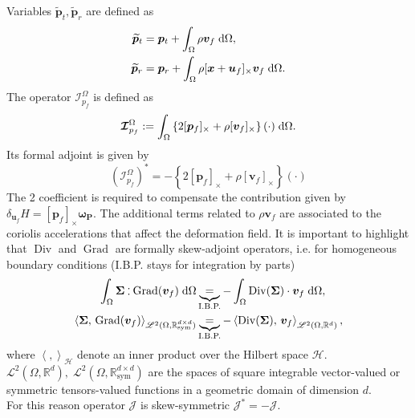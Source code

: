 \documentclass{svjour3}                     %
\DeclareMathOperator*{\Grad}{Grad}
\DeclareMathOperator*{\Div}{Div}
\newcommand{\crmat}[1]{\ensuremath{[#1]_{\times}}}
\def\onedot{$\mathsurround0pt\ldotp$}
\def\cddot{%
	\mathbin{\vcenter{\baselineskip.67ex
			\hbox{\onedot}\hbox{\onedot}}%
}}
\begin{document}
Variables $\widetilde{\bm{p}}_t, \widetilde{\bm{p}}_r$ are defined as
\begin{equation}
\label{eq:mod_momenta}
\begin{aligned}
\widetilde{\bm{p}}_t &= \bm{p}_t + \int_{\Omega} \rho \bm{v}_f \d{\Omega}, \\
\widetilde{\bm{p}}_r &= \bm{p}_r + \int_{\Omega} \rho \crmat{\bm{x} + \bm{u}_f}\bm{v}_f \d{\Omega}. \\
\end{aligned}
\end{equation}
The operator $\bm{\mathcal{I}}_{p_f}^\Omega$ is defined as 
\begin{equation}
\label{eq:mod_momentafl}
\bm{\mathcal{I}}_{p_f}^\Omega := \int_\Omega \left\{2 \crmat{\bm{p}_f} + \rho \crmat{\bm{v}_f} \right\}(\cdot) \d{\Omega}.
\end{equation}
Its  formal adjoint is given by
\begin{equation*}
(\bm{\mathcal{I}}_{p_f}^\Omega)^* = - \left\{2 \crmat{\bm{p}_f} + \rho \crmat{\bm{v}_f} \right\}(\cdot)
\end{equation*} 
The 2 coefficient is required to compensate the contribution given by $\delta_{\bm{u}_f} H = \crmat{\bm{p}_f} \bm{\omega_{P}}$. The additional terms related to $\rho \bm{v}_f$ are associated to the coriolis accelerations that affect the deformation field. It is important to highlight that $\Div$ and $\Grad$ are formally skew-adjoint operators, i.e. for homogeneous boundary conditions (I.B.P. stays for integration by parts)
\begin{align*}
\int_{\Omega} \bm\Sigma \cddot \Grad(\bm{v}_f) \d{\Omega} &\underbrace{=}_{\text{I.B.P.}} -\int_{\Omega} \Div(\bm\Sigma) \cdot \bm{v}_f \d{\Omega}, \\
\left\langle \bm\Sigma, \, \Grad(\bm{v}_f) \right\rangle_{\mathscr{L}^2(\Omega, \mathbb{R}^{d\times d}_{\text{sym}})} &\underbrace{=}_{\text{I.B.P.}} -\left\langle\Div(\bm\Sigma), \, \bm{v}_f \right\rangle_{\mathscr{L}^2(\Omega, \mathbb{R}^d)}, 
\end{align*}
where $\left\langle ,  \right\rangle_\mathscr{H}$ denote an inner product over the Hilbert space $\mathscr{H}$. \\
$\mathscr{L}^2(\Omega, \mathbb{R}^d), \; \mathscr{L}^2(\Omega, \mathbb{R}^{d\times d}_{\text{sym}})$ are the spaces of square integrable vector-valued or symmetric tensors-valued functions in a geometric domain of dimension $d$. \\
For this reason operator $\bm{\mathcal{J}}$ is skew-symmetric $\bm{\mathcal{J}}_{}^* = - \bm{\mathcal{J}}$.
\end{document}
